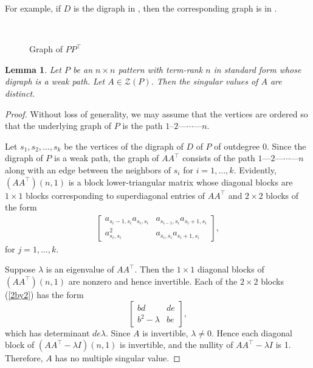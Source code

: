\documentclass[preprint,12pt]{elsarticle}
\newcommand{\trans  }{^\top}
\newtheorem{lemma}[theorem]{Lemma}
\begin{document}
For example, if $D$ is the digraph in 
, 
then the corresponding graph is in . 

\begin{center}
\begin{figure}
\\
\caption{Graph of $PP\trans$}
\label{row}
\end{figure}

\end{center}

\begin{lemma}
\label{zigzagdistinct}
    Let $P$ be an $n\times n$ pattern with term-rank $n$ in standard form whose digraph 
    is a weak path. Let $A \in \mathcal{Z}(P)$.
    Then the singular values of $A$ are distinct. 
\end{lemma}
\begin{proof}
Without loss of generality, we may assume that the vertices are ordered so that the underlying graph of $P$ 
is the path $1$--$2$---$\cdots$---$n$.

Let $s_1,s_2,\dots,s_k$ be the vertices of the digraph of $D$ of $P$ of outdegree $0$. 
Since the digraph of $P$  is a weak path, the graph of $AA\trans$ consists of the path $1$---$2$---$\cdots$---$n$ along with  an  edge between 
the neighbors of $s_i$ for  $i=1,\ldots, k$.
Evidently, $(AA\trans)(n,1)$ is a block lower-triangular matrix whose diagonal blocks are $1\times 1$
blocks corresponding to superdiagonal entries of $AA\trans$ and $2\times 2$
blocks of the form
\begin{align}
\label{2by2}
\left[ 
\begin{array}{cc}
     a_{s_{i}-1,s_i}a_{s_{i},s_i} & a_{s_{i-1},s_i}a_{s_i+1,s_{i}}  \\
     a_{s_{i},s_i}^2 & a_{s_{i}
     ,s_i}a_{s_i+1,s_{i}}
\end{array}
\right],
\end{align}
for $j=1,\ldots, k$.

Suppose $\lambda$ is an eigenvalue of $AA\trans$. Then the $1\times 1$ diagonal blocks
of $(AA\trans)(n,1)$ are nonzero and hence invertible. Each of the $2 \times 2$ blocks (\ref{2by2}) has the form
\[
\left[ 
\begin{array}{cc}
     bd & de  \\
     b^2-\lambda & be
\end{array}
\right],
\]
which has determinant $de\lambda$. Since $A$ is invertible, $\lambda \neq 0$. Hence each diagonal block of $(AA\trans-\lambda I)(n,1)$ is invertible, 
and the nullity of $AA\trans -\lambda I$ is 1. Therefore, $A$ has no multiple singular value.
\end{proof}
\end{document}
